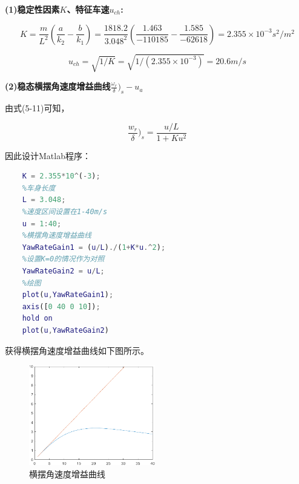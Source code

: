 \noindent \bf{(1)稳定性因素$K$、特征车速$u_{ch}$:}

$$
    K = \frac{m}{L^2}(\frac{a}{k_2}-\frac{b}{k_1})=\frac{1818.2}{3.048^2}(\frac{1.463}{-110185}-\frac{1.585}{-62618})=2.355\times10^{-3} s^2/m^2
$$

$$
    u_{ch} = \sqrt{1/K} = \sqrt{1/(2.355\times10^{-3})} = 20.6 m/s
$$

\noindent \bf{(2)稳态横摆角速度增益曲线$\frac{\omega_r}{\delta})_s-u_a$}

由式(5-11)可知，

$$
    \frac{w_r}{\delta}\big)_s = \frac{u/L}{1+Ku^2}
$$

因此设计Matlab程序：
\begin{lstlisting}[language=Matlab]
    %上题求得的稳定性因数
    K = 2.355*10^(-3);
    %车身长度
    L = 3.048;
    %速度区间设置在1-40m/s
    u = 1:40;
    %横摆角速度增益曲线
    YawRateGain1 = (u/L)./(1+K*u.^2);
    %设置K=0的情况作为对照
    YawRateGain2 = u/L;
    %绘图
    plot(u,YawRateGain1);
    axis([0 40 0 10]);
    hold on
    plot(u,YawRateGain2)
\end{lstlisting}

获得横摆角速度增益曲线如下图所示。

\begin{figure}[h]
    \centering
    \includegraphics[width=5.5cm]{figure/YRG.png}
    \caption{横摆角速度增益曲线}
    \label{YawRateGainCurve}
\end{figure}

